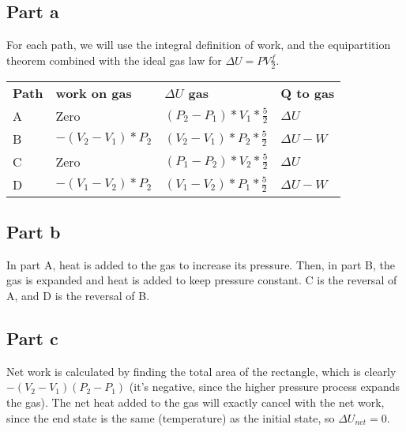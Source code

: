 \documentclass[paper=a4, fontsize=11pt]{scrartcl} %
\numberwithin{equation}{section} %
\numberwithin{figure}{section} %
\numberwithin{table}{section} %
\begin{document}
\subsection*{Part a}

For each path, we will use the integral definition of work, and the equipartition theorem
combined with the ideal gas law for $\Delta U = PV\frac{f}{2}$.
\\
\begin{tabular}{l | l | l | l}
\textbf{Path} & \textbf{work on gas} & \textbf{$\Delta U$ gas} & \textbf{Q to gas}\\
        A        & Zero              & $(P_2-P_1)*V_1*\frac{5}{2}$        & $\Delta U$\\
        B        & $-(V_2-V_1)*P_2$  & $(V_2-V_1)*P_2*\frac{5}{2}$        & $\Delta U - W$ \\
        C        & Zero              & $(P_1-P_2)*V_2*\frac{5}{2}$        & $\Delta U$ \\
        D        & $-(V_1-V_2)*P_2$  & $(V_1-V_2)*P_1*\frac{5}{2}$        & $\Delta U - W$\\
\end{tabular}

\subsection*{Part b}
In part A, heat is added to the gas to increase its pressure. Then, in part B, the gas is
expanded and heat is added to keep pressure constant. C is the reversal of A, and D is the reversal
of B.

\subsection*{Part c}
Net work is calculated by finding the total area of the rectangle, which is clearly
$-(V_2-V_1)(P_2-P_1)$ (it's negative, since the higher pressure process expands the gas).
The net heat added to the gas will exactly cancel with the net work, since the end state is
the same (temperature) as the initial state, so $\Delta U_{net} = 0$.



\end{document}
